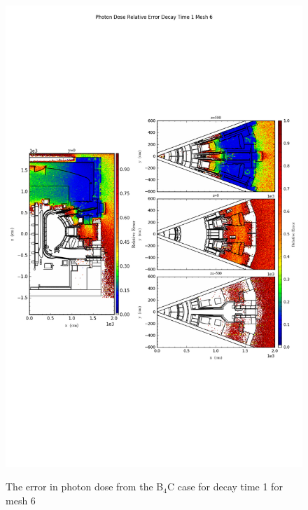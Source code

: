 \begin{figure}[ht!]
\centering
\includegraphics[trim={0cm 9cm 0cm 10cm},clip,scale=0.75]{../plots/final_model_nob4c/Photon_Dose_Relative_Error_Decay_Time_1_Mesh_6.png}
\label{fig:photons_dc1_no4bc_m6_error}
\caption{The error in photon dose from the B$_4$C case for decay time 1 for mesh 6}
\end{figure}
